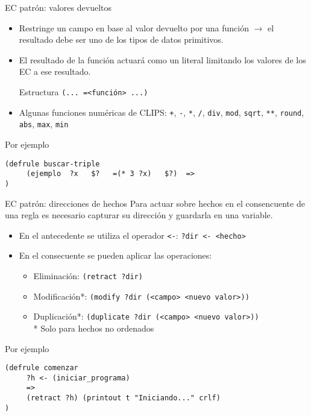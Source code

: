 \documentclass[usenames,dvipsnames,aspectratio=169]{beamer}
\begin{document}
\begin{frame}[fragile]{EC patrón: valores devueltos}
	\begin{itemize}
		\item Restringe un campo en base al valor devuelto por una función $\rightarrow$ el resultado debe ser uno de los tipos de datos primitivos.
		\item El resultado de la función actuará como un literal limitando los valores de los EC a ese resultado.
		\begin{block}{Estructura}
			\texttt{(... =<función> ...)}
		\end{block}
		\item Algunas funciones numéricas de CLIPS: \texttt{+}, \texttt{-}, \texttt{*}, \texttt{/}, \texttt{div}, \texttt{mod}, \texttt{sqrt}, \texttt{**}, \texttt{round}, \texttt{abs}, \texttt{max}, \texttt{min}
	\end{itemize}
	\begin{exampleblock}{Por ejemplo}
		\begin{verbatim}
(defrule buscar-triple
     (ejemplo  ?x   $?   =(* 3 ?x)   $?)  =>
)
		\end{verbatim}
	\end{exampleblock}
\end{frame}

\begin{frame}[fragile]{EC patrón: direcciones de hechos}
	 Para actuar sobre hechos en el consencuente de una regla es necesario capturar su dirección y guardarla en una variable.
	\begin{itemize}
		\item En el antecedente se utiliza el operador \texttt{<-}: \texttt{?dir <- <hecho>}
		\item En el consecuente se pueden aplicar las operaciones:
		\begin{itemize}
			\item Eliminación: \texttt{(retract ?dir)}
			\item Modificación*: \texttt{(modify ?dir (<campo> <nuevo valor>))}
			\item Duplicación*: \texttt{(duplicate ?dir (<campo> <nuevo valor>))}\\
			* Solo para hechos no ordenados
		\end{itemize}
	\end{itemize}
	\begin{exampleblock}{Por ejemplo}
		\footnotesize
		\begin{verbatim}
(defrule comenzar
     ?h <- (iniciar_programa)
     =>
     (retract ?h) (printout t "Iniciando..." crlf)
)
		\end{verbatim}
	\end{exampleblock}
\end{frame}
\end{document}
